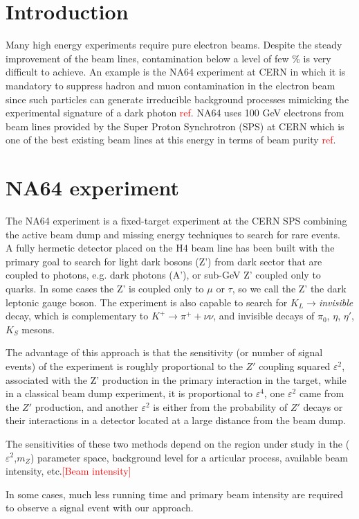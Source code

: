 \section{Introduction}
Many high energy experiments require pure electron beams. Despite the steady improvement of the beam lines,
contamination below a level of few \% is very difficult to achieve. An example is the NA64 experiment at CERN in which it
is mandatory to suppress hadron and muon contamination in the electron beam since such particles can generate
irreducible background processes mimicking the experimental signature of a dark photon \textcolor{red}{ref}. NA64 uses 100 GeV
electrons from beam lines provided by the Super Proton Synchrotron (SPS) at CERN which is one of the best existing beam lines at this energy in terms of beam
purity \textcolor{red}{ref}.



\section{NA64 experiment}

The NA64 experiment is a fixed-target experiment at the CERN SPS combining the active beam dump and missing energy
techniques to search for rare events.\\ A fully hermetic detector placed on the H4 beam line has been built with the
primary goal to search for light dark bosons (Z') from dark sector that are coupled to photons, e.g. dark photons (A'),
or sub-GeV Z' coupled only to quarks. In some cases the Z' is coupled only to $\mu$ or $\tau$, so we call the Z' the
dark leptonic gauge boson. The experiment is also capable to search for $K_L \rightarrow ${\it invisible} decay, which is
complementary to $K^+\rightarrow \pi^+ + \nu \nu$, and invisible decays of $\pi_0$, $\eta$, $\eta'$, $K_S$ mesons.\par
The advantage of this approach is that the sensitivity (or number of signal events) of the experiment is roughly proportional
to the $Z'$ coupling squared $\varepsilon^2$, associated with the Z' production in the primary interaction in the target,
while in a classical beam dump experiment, it is proportional to $\varepsilon^4$, one $\varepsilon^2$ came from the $Z'$
production, and another $\varepsilon^2$ is either from the probability of $Z'$ decays or their interactions in a detector
located at a large distance from the beam dump.\par
The sensitivities of these two methods depend on the region under study in the ($\varepsilon^2$,$m_Z$) parameter space, background level for a articular process, available beam intensity,
etc.\textcolor{red}{[Beam intensity]}\par
In some cases, much less running time and primary beam intensity are required to observe a signal event with our approach.\par

